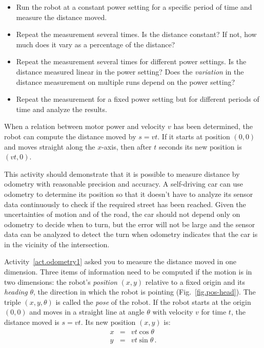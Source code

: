 \begin{framed}
\begin{itemize}
\item Run the robot at a constant power setting for a specific period of time and measure the distance moved.
\item Repeat the measurement several times. Is the distance constant? If not, how much does it vary as a percentage of the distance?
\item Repeat the measurement several times for different power settings. Is the distance measured linear in the power setting? Does the \emph{variation} in the distance measurement on multiple runs depend on the power setting?
\item Repeat the measurement for a fixed power setting but for different periods of time and analyze the results.
\end{itemize}
\end{framed}

When a relation between motor power and velocity $v$ has been determined, the robot can compute the distance moved by $s=vt$. If it starts at position $(0,0)$ and moves straight along the $x$-axis, then after $t$ seconds its new position is $(vt,0)$.

This activity should demonstrate that it is possible to measure distance by odometry with reasonable precision and accuracy. A self-driving car can use odometry to determine its position so that it doesn't have to analyze its sensor data continuously to check if the required street has been reached. Given the uncertainties of motion and of the road, the car should not depend only on odometry to decide when to turn, but the error will not be large and the sensor data can be analyzed to detect the turn when odometry indicates that the car is in the vicinity of the intersection.

Activity~\ref{act.odometry1} asked you to measure the distance moved in one dimension. Three items of information need to be computed if the motion is in two dimensions: the robot's \emph{position} $(x,y)$ relative to a fixed origin and its \emph{heading} $\theta$, the direction in which the robot is pointing (Fig.~\ref{fig.pos-head}). The triple $(x,y,\theta)$ is called the \emph{pose} of the robot. If the robot starts at the origin $(0,0)$ and moves in a straight line at angle $\theta$ with velocity $v$ for time $t$, the distance moved is $s=vt$. Its new position $(x,y)$ is:
\begin{eqnarray*}
x &=& vt \cos \theta\\
y &=& vt \sin \theta\,.
\end{eqnarray*}

